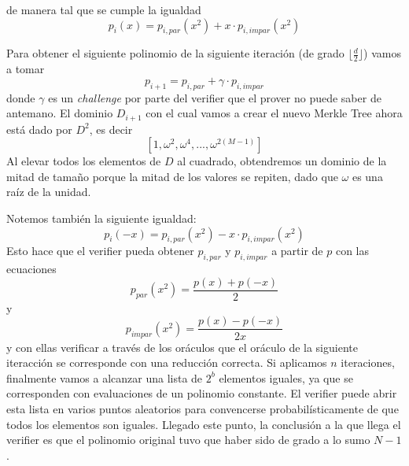 \documentclass[11pt,a4paper]{tesis}
\begin{document}
de manera tal que se cumple la igualdad 
$$p_i(x) = p_{i,par}(x^2) + x \cdot p_{i,impar}(x^2)$$

Para obtener el siguiente polinomio de la siguiente iteración (de grado $\lfloor \frac{d}{2} \rfloor$) vamos a tomar 
$$p_{i+1} = p_{i,par} + \gamma \cdot p_{i,impar}$$
donde $\gamma$ es un \textit{challenge} por parte del verifier que el prover no puede saber de antemano. El dominio $D_{i+1}$ con el cual vamos a crear el nuevo Merkle Tree ahora está dado por $D^2$, es decir 
$$[1, \omega^2, \omega^4, ..., \omega^{2(M-1)}]$$
Al elevar todos los elementos de $D$ al cuadrado, obtendremos un dominio de la mitad de tamaño porque la mitad de los valores se repiten, dado que $\omega$ es una raíz de la unidad. 

Notemos también la siguiente igualdad:
$$p_i(-x) = p_{i,par}(x^2) - x \cdot p_{i,impar}(x^2)$$
Esto hace que el verifier pueda obtener $p_{i, par}$ y $p_{i, impar}$ a partir de $p$ con las ecuaciones
$$p_{par}(x^2) = \frac{p(x) + p(-x)}{2}$$ y 
$$p_{impar}(x^2) = \frac{p(x) - p(-x)}{2x}$$
y con ellas verificar a través de los oráculos que el oráculo de la siguiente iteracción se corresponde con una reducción correcta. Si aplicamos $n$ iteraciones, finalmente vamos a alcanzar una lista de $2^b$ elementos iguales, ya que se corresponden con evaluaciones de un polinomio constante. El verifier puede abrir esta lista en varios puntos aleatorios para convencerse probabilísticamente de que todos los elementos son iguales. Llegado este punto, la conclusión a la que llega el verifier es que el polinomio original tuvo que haber sido de grado a lo sumo $N-1$. 

\newpage


\end{document}
